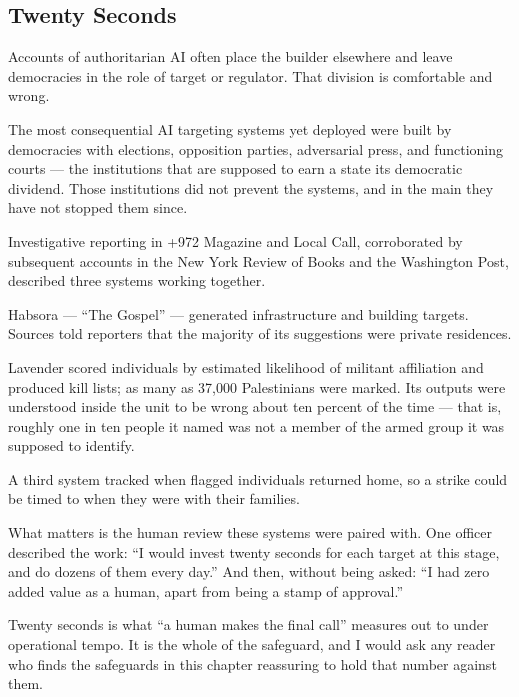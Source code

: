 \subsection{Twenty Seconds}
\label{sec:6.3.1}
Accounts of authoritarian AI often place the builder elsewhere and leave democracies in the role of target or regulator. That division is comfortable and wrong.

The most consequential AI targeting systems yet deployed were built by democracies with elections, opposition parties, adversarial press, and functioning courts — the institutions that are supposed to earn a state its democratic dividend. Those institutions did not prevent the systems, and in the main they have not stopped them since.


\begin{esbox}
Investigative reporting in +972 Magazine and Local Call, corroborated by subsequent accounts in the New York Review of Books and the Washington Post, described three systems working together.

Habsora — “The Gospel” — generated infrastructure and building targets. Sources told reporters that the majority of its suggestions were private residences.

Lavender scored individuals by estimated likelihood of militant affiliation and produced kill lists; as many as 37,000 Palestinians were marked. Its outputs were understood inside the unit to be wrong about ten percent of the time — that is, roughly one in ten people it named was not a member of the armed group it was supposed to identify.

A third system tracked when flagged individuals returned home, so a strike could be timed to when they were with their families.

What matters is the human review these systems were paired with. One officer described the work: “I would invest twenty seconds for each target at this stage, and do dozens of them every day.” And then, without being asked: “I had zero added value as a human, apart from being a stamp of approval.” \autocite{abraham2024lavender}

\end{esbox}
Twenty seconds is what “a human makes the final call” measures out to under operational tempo. It is the whole of the safeguard, and I would ask any reader who finds the safeguards in this chapter reassuring to hold that number against them.

